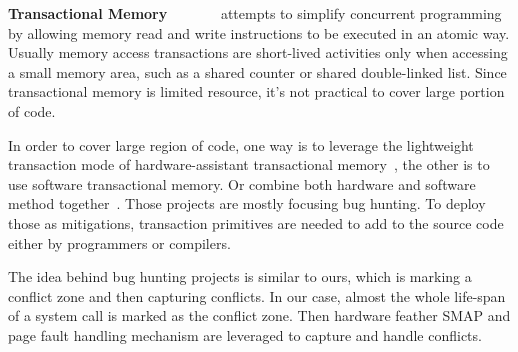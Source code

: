 

\textbf{Transactional Memory}~\cite{herlihy1993transactional}~\cite{shavit1997software}~\cite{rajwar2012intel}~\cite{haring2012ibm}~\cite{jacobi2012transactional}~\cite{click2009azul}~\cite{dice2009early} attempts to simplify concurrent programming by allowing memory read and write instructions to be executed in an atomic way. Usually memory access transactions are short-lived activities only when accessing a small memory area, such as a shared counter or shared double-linked list. Since transactional memory is limited resource, it's not practical to cover large portion of code. 

In order to cover large region of code, one way is to leverage the lightweight transaction mode of hardware-assistant transactional memory~\cite{gupta2009using}, the other is to use software transactional memory\cite{kestor2014trex}. Or combine both hardware and software method together~\cite{zhang2016txrace}. Those projects are mostly focusing bug hunting. To deploy those as mitigations, transaction primitives are needed to add to the source code either by programmers or compilers.

The idea behind bug hunting projects is similar to ours, which is marking a conflict zone and then capturing conflicts. In our case, almost the whole life-span of a system call is marked as the conflict zone. Then hardware feather SMAP and page fault handling mechanism are leveraged to capture and handle conflicts.




